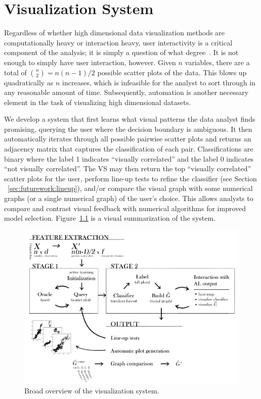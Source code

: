 \chapter{Visualization System \label{ch:visualizer}}

Regardless of whether high dimensional data visualization methods are
computationally heavy or interaction heavy, user interactivity is a critical
component of the analysis; it is simply a question of what 
degree~\cite{lius2016}. It is not enough to simply have user interaction, 
however. Given $n$ variables, there are a total of ${n \choose 2} = n(n-1)/2$ 
possible scatter plots of the data. This blows up quadratically as $n$ 
increases, which is infeasible for the analyst to sort through in any 
reasonable amount of time. Subsequently, automation is another necessary 
element in the task of visualizing high dimensional datasets.

We develop a system that first learns what visual patterns the data analyst 
finds promising, querying the user where the decision boundary is ambiguous. It 
then automatically iterates through all possible pairwise scatter plots and 
returns an adjacency matrix that captures the classification of each pair. 
Classifications are binary where the label 1 indicates ``visually correlated'' 
and the label 0 indicates ``not visually correlated''. The VS may then return 
the top ``visually correlated'' scatter plots for the user, perform line-up 
tests to refine the classifier (see Section ~\ref{sec:futurework:lineup}), 
and/or compare the visual graph with some numerical graphs (or a single 
numerical graph) of the user's choice. This allows analysts to compare and 
contrast visual feedback with numerical algorithms for improved model 
selection. 
Figure~\ref{fig:visualizer:vs} is a visual summarization of the system.
       
\begin{figure}[htb]
	\begin{center}
		\includegraphics[width=1\linewidth]{ch-visualizer/figures/vs}
		\caption[Broad overview of the visualization system.]{Broad overview of 
		the visualization system.}
		\label{fig:visualizer:vs}
	\end{center}
\end{figure}

